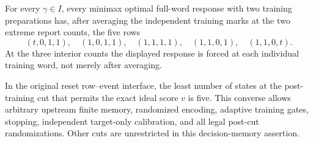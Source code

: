 \begin{theorem}
\label{thm:five-memory}
For every $\gamma\in I$, every minimax optimal full-word response with
two training preparations has, after averaging the independent training
marks at the two extreme report counts, the five rows
\begin{equation}\label{eq:rigid-five}
 (t,0,1,1),\quad (1,0,1,1),\quad (1,1,1,1),\quad
 (1,1,0,1),\quad (1,1,0,t).
\end{equation}
At the three interior counts the displayed response is forced at each
individual training word, not merely after averaging.

In the original reset row--event interface, the least number of states
at the post-training cut that permits the exact ideal score $v$ is five.
This converse allows arbitrary upstream finite memory, randomized
encoding, adaptive training gates, stopping, independent target-only
calibration, and all legal post-cut randomizations. Other cuts are
unrestricted in this decision-memory assertion.
\end{theorem}
